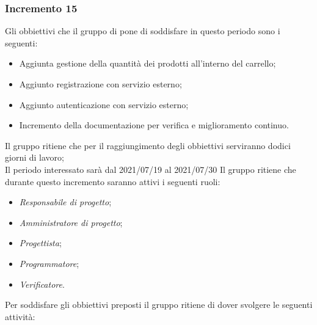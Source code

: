 \subsubsection{Incremento 15}
Gli obbiettivi che il gruppo di pone di soddisfare in questo periodo sono i seguenti:
\begin{itemize}
    \item Aggiunta gestione della quantità dei prodotti all'interno del carrello;
    \item Aggiunto registrazione con servizio esterno;
    \item Aggiunto autenticazione con servizio esterno;
    \item Incremento della documentazione per verifica e miglioramento continuo.
\end{itemize}
Il gruppo ritiene che per il raggiungimento degli obbiettivi serviranno dodici giorni di lavoro;\\
Il periodo interessato sarà dal 2021/07/19 al 2021/07/30
Il gruppo ritiene che durante questo incremento saranno attivi i seguenti ruoli:
\begin{itemize}
    \item \textit{Responsabile di progetto};
    \item \textit{Amministratore di progetto};
    \item \textit{Progettista};
    \item \textit{Programmatore};
    \item \textit{Verificatore}.
\end{itemize}
Per soddisfare gli obbiettivi preposti il gruppo ritiene di dover svolgere le seguenti attività:
